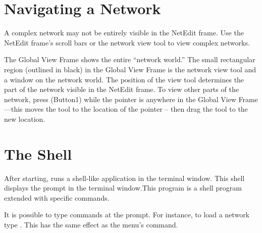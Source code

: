 \section{Navigating a Network}
\label{sec:navnetwork}

A complex network may not be entirely visible in the NetEdit frame.
Use the NetEdit frame's scroll bars or the network view tool to view
complex networks.

The Global View Frame shows the entire ``network world.''  The small
rectangular region (outlined in black) in the Global View Frame is the
network view tool and a window on the network world. The position of
the view tool determines the part of the network visible in the
NetEdit frame.  To view other parts of the network, press
\keyboard(Button1) while the pointer is anywhere in the Global View
Frame---this moves the tool to the location of the pointer -- then
drag the tool to the new location.


\section{The \sr{} Shell}
\label{sec:termapp}

After starting, \sr{} runs a shell-like application in the terminal
window. This shell displays the prompt
 in the terminal window.This program is a
 shell program extended with
\sr{} specific commands.

It is possible to type \tcl{} \sr{} commands at the prompt.  For
instance, to load a network type .  This has the same effect as the 
menu's  command.
